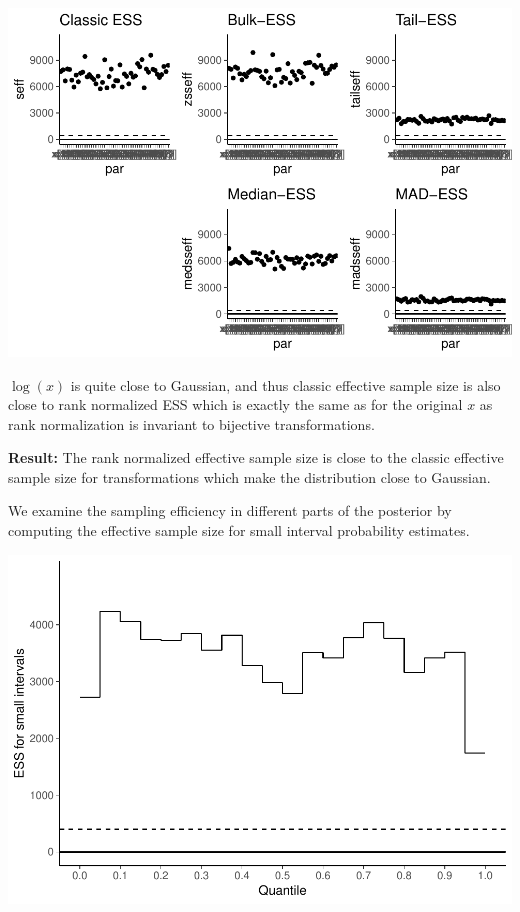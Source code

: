 \documentclass[american,]{article}
\begin{document}
\includegraphics{graphics/ess-fit-half-nom-2-1.pdf}

\(\log(x)\) is quite close to Gaussian, and thus classic effective
sample size is also close to rank normalized ESS which is exactly the
same as for the original \(x\) as rank normalization is invariant to
bijective transformations.

\textbf{Result:} The rank normalized effective sample size is close to
the classic effective sample size for transformations which make the
distribution close to Gaussian.

We examine the sampling efficiency in different parts of the posterior
by computing the effective sample size for small interval probability
estimates.

\includegraphics{graphics/local-ess-fit-half-nom-1.pdf}
\end{document}
